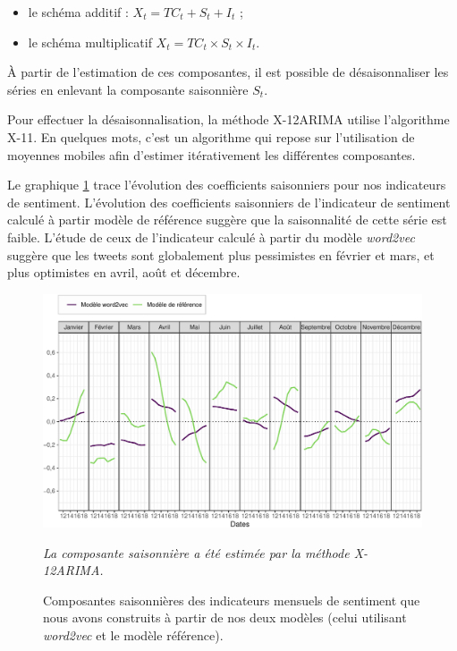 \documentclass[11pt,french,french]{article}
\begin{document}
\begin{itemize}
\item
  le schéma additif : \(X_t=TC_t+S_t+I_t\) ;
\item
  le schéma multiplicatif \(X_t=TC_t\times S_t\times I_t\).
\end{itemize}

À partir de l'estimation de ces composantes, il est possible de
désaisonnaliser les séries en enlevant la composante saisonnière
\(S_t\).

Pour effectuer la désaisonnalisation, la méthode X-12ARIMA utilise
l'algorithme X-11. En quelques mots, c'est un algorithme qui repose sur
l'utilisation de moyennes mobiles afin d'estimer itérativement les
différentes composantes.

Le graphique \ref{fig:coefcvscjo} trace l'évolution des coefficients
saisonniers pour nos indicateurs de sentiment. L'évolution des
coefficients saisonniers de l'indicateur de sentiment calculé à partir
modèle de référence suggère que la saisonnalité de cette série est
faible. L'étude de ceux de l'indicateur calculé à partir du modèle
\emph{word2vec} suggère que les tweets sont globalement plus pessimistes
en février et mars, et plus optimistes en avril, août et décembre.

\begin{figure}[htp]
{\centering\includegraphics[width = \textwidth]{img/rmd-graphCoefCVS-1}}
\captionsetup{margin=0cm,format=hang,justification=justified}
\caption{Composantes saisonnières des indicateurs mensuels de sentiment que nous avons construits à partir de nos deux modèles (celui utilisant  \emph{word2vec} et le modèle référence).}\label{fig:coefcvscjo}
\footnotesize

\emph{La composante saisonnière a été estimée par la méthode X-12ARIMA.}
\end{figure}
\end{document}

